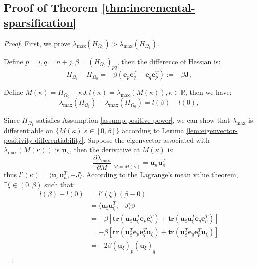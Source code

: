\documentclass{article}
\theoremstyle{plain}
\theoremstyle{definition}
\theoremstyle{remark}
\begin{document}
\subsection{Proof of Theorem \ref{thm:incremental-sparsification}}
\begin{proof}
First, we prove $\lambda_{\max}(H_{\Omega_0}) > \lambda_{\max}(H_{\Omega_1})$.

Define $p = i, q = n + j, \beta = (H_{\Omega_0})_{pq}$, then the difference of Hessian is:
\begin{equation*}
    H_{\Omega_1} - H_{\Omega_0} = -\beta \left( \mathbf{e}_p \mathbf{e}_q^{T} + \mathbf{e}_q \mathbf{e}_p^{T} \right) := -\beta \mathbf{J},
\end{equation*}

Define $M(\kappa) = H_{\Omega_0} - \kappa J, l(\kappa) = \lambda_{\max}(M(\kappa)), \kappa \in \mathbb{R}$, then we have:
\begin{equation*}
    \lambda_{\max}(H_{\Omega_1}) - \lambda_{\max}(H_{\Omega_0}) = l(\beta) - l(0),
\end{equation*}

Since $H_{\Omega_1}$ satisfies Assumption \ref{assump:positive-power}, we can show that $\lambda_{\max}$ is differentiable on $\{ M(\kappa) | \kappa \in [0, \beta]\}$ according to Lemma \ref{lem:eigenvector-positivity-differentiability}.
Suppose the eigenvector associated with $\lambda_{\max}(M(\kappa))$ is $\mathbf{u}_{\kappa}$, then the derivative at $M(\kappa)$ is:
\begin{equation*}
    \frac{\partial \lambda_{\max}}{\partial M} \Big|_{M = M(\kappa)} = \mathbf{u}_{\kappa} \mathbf{u}_{\kappa}^{T}
\end{equation*}
thus $l'(\kappa) = \langle \mathbf{u}_{\kappa} \mathbf{u}_{\kappa}^T, -J \rangle$.
According to the Lagrange's mean value theorem, $\exists \xi \in (0, \beta)$ such that:
\begin{equation} \label{eq:lambda-max-diff}
    \begin{aligned}
        l(\beta) - l(0) &= l'(\xi) (\beta - 0) \\
        &= \langle \mathbf{u}_{\xi} \mathbf{u}_{\xi}^{T}, -J \rangle \beta \\
        &= -\beta \left[ \boldsymbol{tr}(\mathbf{u}_{\xi} \mathbf{u}_{\xi}^{T} \mathbf{e}_p \mathbf{e}_q^T)
                        +\boldsymbol{tr}(\mathbf{u}_{\xi} \mathbf{u}_{\xi}^{T} \mathbf{e}_q \mathbf{e}_p^T) \right] \\
        &= -\beta \left[ \boldsymbol{tr}(\mathbf{u}_{\xi}^{T} \mathbf{e}_p \mathbf{e}_q^T \mathbf{u}_{\xi})
                        +\boldsymbol{tr}(\mathbf{u}_{\xi}^{T} \mathbf{e}_q \mathbf{e}_p^T \mathbf{u}_{\xi}) \right] \\
        &= -2\beta (\mathbf{u}_{\xi})_p (\mathbf{u}_{\xi})_q
    \end{aligned}
\end{equation}


\end{proof}
\end{document}
